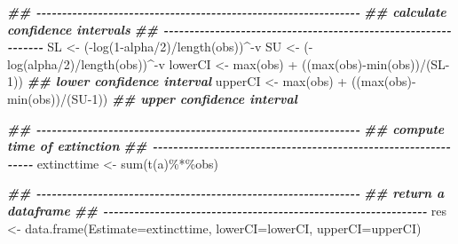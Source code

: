 \documentclass[
]{article}
\newenvironment{Shaded}{\begin{snugshade}}{\end{snugshade}}
\newcommand{\AttributeTok}[1]{\textcolor[rgb]{0.77,0.63,0.00}{#1}}
\newcommand{\DecValTok}[1]{\textcolor[rgb]{0.00,0.00,0.81}{#1}}
\newcommand{\DocumentationTok}[1]{\textcolor[rgb]{0.56,0.35,0.01}{\textbf{\textit{#1}}}}
\newcommand{\FunctionTok}[1]{\textcolor[rgb]{0.00,0.00,0.00}{#1}}
\newcommand{\NormalTok}[1]{#1}
\newcommand{\OtherTok}[1]{\textcolor[rgb]{0.56,0.35,0.01}{#1}}
\newcommand{\SpecialCharTok}[1]{\textcolor[rgb]{0.00,0.00,0.00}{#1}}
\begin{document}
\begin{Shaded}
\begin{Highlighting}[]
    \DocumentationTok{\#\# {-}{-}{-}{-}{-}{-}{-}{-}{-}{-}{-}{-}{-}{-}{-}{-}{-}{-}{-}{-}{-}{-}{-}{-}{-}{-}{-}{-}{-}{-}{-}{-}{-}{-}{-}{-}{-}{-}{-}{-}{-}{-}{-}{-}{-}{-}{-}{-}{-}{-}{-}{-}{-}{-}{-}{-}{-}{-}{-}{-}{-}{-}{-}}
    \DocumentationTok{\#\# calculate confidence intervals}
    \DocumentationTok{\#\# {-}{-}{-}{-}{-}{-}{-}{-}{-}{-}{-}{-}{-}{-}{-}{-}{-}{-}{-}{-}{-}{-}{-}{-}{-}{-}{-}{-}{-}{-}{-}{-}{-}{-}{-}{-}{-}{-}{-}{-}{-}{-}{-}{-}{-}{-}{-}{-}{-}{-}{-}{-}{-}{-}{-}{-}{-}{-}{-}{-}{-}{-}{-}}
\NormalTok{    SL     }\OtherTok{\textless{}{-}}\NormalTok{ (}\SpecialCharTok{{-}}\FunctionTok{log}\NormalTok{(}\DecValTok{1}\SpecialCharTok{{-}}\NormalTok{alpha}\SpecialCharTok{/}\DecValTok{2}\NormalTok{)}\SpecialCharTok{/}\FunctionTok{length}\NormalTok{(obs))}\SpecialCharTok{\^{}{-}}\NormalTok{v}
\NormalTok{    SU     }\OtherTok{\textless{}{-}}\NormalTok{ (}\SpecialCharTok{{-}}\FunctionTok{log}\NormalTok{(alpha}\SpecialCharTok{/}\DecValTok{2}\NormalTok{)}\SpecialCharTok{/}\FunctionTok{length}\NormalTok{(obs))}\SpecialCharTok{\^{}{-}}\NormalTok{v}
\NormalTok{    lowerCI }\OtherTok{\textless{}{-}} \FunctionTok{max}\NormalTok{(obs) }\SpecialCharTok{+}\NormalTok{ ((}\FunctionTok{max}\NormalTok{(obs)}\SpecialCharTok{{-}}\FunctionTok{min}\NormalTok{(obs))}\SpecialCharTok{/}\NormalTok{(SL}\DecValTok{{-}1}\NormalTok{)) }\DocumentationTok{\#\# lower confidence interval}
\NormalTok{    upperCI }\OtherTok{\textless{}{-}} \FunctionTok{max}\NormalTok{(obs) }\SpecialCharTok{+}\NormalTok{ ((}\FunctionTok{max}\NormalTok{(obs)}\SpecialCharTok{{-}}\FunctionTok{min}\NormalTok{(obs))}\SpecialCharTok{/}\NormalTok{(SU}\DecValTok{{-}1}\NormalTok{)) }\DocumentationTok{\#\# upper confidence interval}
    
    \DocumentationTok{\#\# {-}{-}{-}{-}{-}{-}{-}{-}{-}{-}{-}{-}{-}{-}{-}{-}{-}{-}{-}{-}{-}{-}{-}{-}{-}{-}{-}{-}{-}{-}{-}{-}{-}{-}{-}{-}{-}{-}{-}{-}{-}{-}{-}{-}{-}{-}{-}{-}{-}{-}{-}{-}{-}{-}{-}{-}{-}{-}{-}{-}{-}{-}{-}}
    \DocumentationTok{\#\# compute time of extinction}
    \DocumentationTok{\#\# {-}{-}{-}{-}{-}{-}{-}{-}{-}{-}{-}{-}{-}{-}{-}{-}{-}{-}{-}{-}{-}{-}{-}{-}{-}{-}{-}{-}{-}{-}{-}{-}{-}{-}{-}{-}{-}{-}{-}{-}{-}{-}{-}{-}{-}{-}{-}{-}{-}{-}{-}{-}{-}{-}{-}{-}{-}{-}{-}{-}{-}{-}{-}}
\NormalTok{    extincttime }\OtherTok{\textless{}{-}} \FunctionTok{sum}\NormalTok{(}\FunctionTok{t}\NormalTok{(a)}\SpecialCharTok{\%*\%}\NormalTok{obs)}
    
    \DocumentationTok{\#\# {-}{-}{-}{-}{-}{-}{-}{-}{-}{-}{-}{-}{-}{-}{-}{-}{-}{-}{-}{-}{-}{-}{-}{-}{-}{-}{-}{-}{-}{-}{-}{-}{-}{-}{-}{-}{-}{-}{-}{-}{-}{-}{-}{-}{-}{-}{-}{-}{-}{-}{-}{-}{-}{-}{-}{-}{-}{-}{-}{-}{-}{-}{-}}
    \DocumentationTok{\#\# return a dataframe}
    \DocumentationTok{\#\# {-}{-}{-}{-}{-}{-}{-}{-}{-}{-}{-}{-}{-}{-}{-}{-}{-}{-}{-}{-}{-}{-}{-}{-}{-}{-}{-}{-}{-}{-}{-}{-}{-}{-}{-}{-}{-}{-}{-}{-}{-}{-}{-}{-}{-}{-}{-}{-}{-}{-}{-}{-}{-}{-}{-}{-}{-}{-}{-}{-}{-}{-}{-}}
\NormalTok{    res }\OtherTok{\textless{}{-}} \FunctionTok{data.frame}\NormalTok{(}\AttributeTok{Estimate=}\NormalTok{extincttime, }\AttributeTok{lowerCI=}\NormalTok{lowerCI, }\AttributeTok{upperCI=}\NormalTok{upperCI)}
    

\end{Highlighting}
\end{Shaded}
\end{document}
